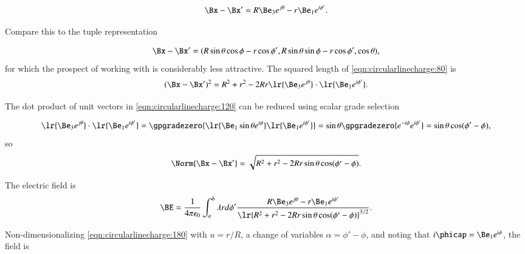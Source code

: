 \begin{dmath}\label{eqn:circularlinecharge:80}
\Bx - \Bx'
=
R \Be_3 e^{j \theta } - r \Be_1 e^{i \phi'}.
\end{dmath}

Compare this to the tuple representation

\begin{dmath}\label{eqn:circularlinecharge:100}
\Bx - \Bx'
= ( R \sin\theta \cos\phi - r \cos\phi', R \sin\theta \sin\phi - r \cos\phi', \cos\theta ),
\end{dmath}
for which the prospect of working with is considerably less attractive.
The squared length of \cref{eqn:circularlinecharge:80} is
\begin{dmath}\label{eqn:circularlinecharge:120}
(\Bx - \Bx')^2
=
R^2 + r^2 - 2 R r \lr{\Be_3 e^{j \theta} } \cdot \lr{ \Be_1 e^{i \phi'} }.
\end{dmath}

The dot product of unit vectors in \cref{eqn:circularlinecharge:120} can be reduced using scalar grade selection

\begin{dmath}\label{eqn:circularlinecharge:140}
\lr{\Be_3 e^{j \theta }} \cdot \lr{ \Be_1 e^{i \phi'} }
=
\gpgradezero{
\lr{ \Be_1 \sin\theta e^{i \phi} } \lr{ \Be_1 e^{i \phi'}}
}
=
\sin\theta
\gpgradezero{
e^{-i \phi} e^{i \phi'}
}
=
\sin\theta \cos( \phi' - \phi ),
\end{dmath}
so
\begin{dmath}\label{eqn:circularlinecharge:160}
\Norm{ \Bx - \Bx' }
=
\sqrt{
R^2 + r^2 - 2 R r \sin\theta \cos( \phi' - \phi )
}.
\end{dmath}

The electric field is
\begin{dmath}\label{eqn:circularlinecharge:180}
\BE = \frac{1}{4 \pi \epsilon_0} \int_a^b \lambda r d\phi' \frac{ R \Be_3 e^{j \theta } - r \Be_1 e^{i \phi'} }{\lr{ R^2 + r^2 - 2 R r \sin\theta \cos( \phi' - \phi ) }^{3/2} }.
\end{dmath}

Non-dimensionalizing \cref{eqn:circularlinecharge:180} with \( u = r/R \), a change of variables \( \alpha = \phi' - \phi \), and noting that \( i \phicap = \Be_1 e^{i \phi} \), the field is

